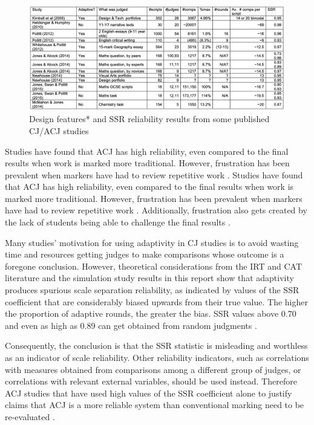	
	\begin{figure}[h]
			\includegraphics[width=\textwidth]{graphics/cambridge_results.png}
			\caption{Design features* and SSR reliability results from some published CJ/ACJ studies \cite{bramley2015investigating}}
			\label{fig:studies_comparison}
			\centering
		\end{figure}
	
	Studies have found that ACJ has high reliability, even compared to the final results when work is marked more traditional. However,  frustration has been prevalent when markers have had to review repetitive work \cite{bartholomew2019tool}. Studies have found that ACJ has high reliability, even compared to the final results when work is marked more traditional. However,  frustration has been prevalent when markers have had to review repetitive work \cite{bartholomew2019tool}. Additionally, frustration also gets created by the lack of students being able to challenge the final results \cite{bartholomew2019tool}. 
	
	Many studies' motivation for using adaptivity in CJ studies is to avoid wasting time and resources getting judges to make comparisons whose outcome is a foregone conclusion. However, theoretical considerations from the IRT and CAT literature and the simulation study results in this report show that adaptivity produces spurious scale separation reliability, as indicated by values of the SSR coefficient that are considerably biased upwards from their true value. The higher the proportion of adaptive rounds, the greater the bias. SSR values above 0.70 and even as high as 0.89 can get obtained from random judgments \cite{bramley2015investigating}.  
	
	Consequently, the conclusion is that the SSR statistic is misleading and worthless as an indicator of scale reliability. Other reliability indicators, such as correlations with measures obtained from comparisons among a different group of judges, or correlations with relevant external variables, should be used instead. Therefore ACJ studies that have used high values of the SSR coefficient alone to justify claims that ACJ is a more reliable system than conventional marking need to be re-evaluated \cite{ bramley2015investigating}.
	

